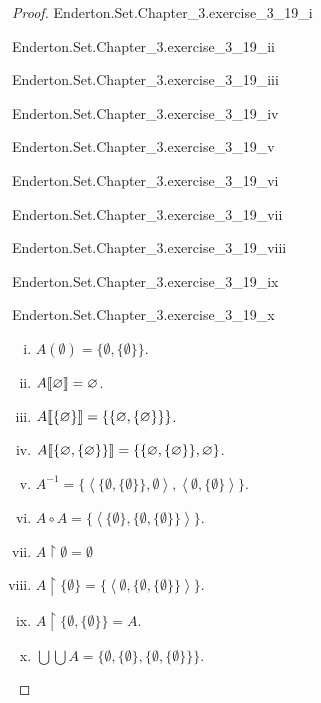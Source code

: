 \documentclass{report}
\newcommand{\pair}[1]{\left< #1 \right>}
\begin{document}
\begin{proof}

  \statementpadding

    {Enderton.Set.Chapter\_3.exercise\_3\_19\_i}

    {Enderton.Set.Chapter\_3.exercise\_3\_19\_ii}

    {Enderton.Set.Chapter\_3.exercise\_3\_19\_iii}

    {Enderton.Set.Chapter\_3.exercise\_3\_19\_iv}

    {Enderton.Set.Chapter\_3.exercise\_3\_19\_v}

    {Enderton.Set.Chapter\_3.exercise\_3\_19\_vi}

    {Enderton.Set.Chapter\_3.exercise\_3\_19\_vii}

    {Enderton.Set.Chapter\_3.exercise\_3\_19\_viii}

    {Enderton.Set.Chapter\_3.exercise\_3\_19\_ix}

    {Enderton.Set.Chapter\_3.exercise\_3\_19\_x}

  \begin{enumerate}[(i)]
    \item $A(\emptyset) = \{\emptyset, \{\emptyset\}\}$.
    \item $A\!\left\llbracket\varnothing\right\rrbracket = \varnothing$.
    \item $A\!\left\llbracket\{\varnothing\}\right\rrbracket = \{\{\varnothing, \{\varnothing\}\}\}$.
    \item $A\!\left\llbracket\{\varnothing, \{\varnothing\}\}\right\rrbracket =
      \{\{\varnothing, \{\varnothing\}\}, \varnothing\}$.
    \item $A^{-1} = \{
      \pair{\{\emptyset, \{\emptyset\}\}, \emptyset},
      \pair{\emptyset, \{\emptyset\}}
    \}$.
    \item $A \circ A =
      \{\pair{\{\emptyset\}, \{\emptyset, \{\emptyset\}\}}\}$.
    \item $A \restriction \emptyset = \emptyset$
    \item $A \restriction \{\emptyset\} =
      \{\pair{\emptyset, \{\emptyset, \{\emptyset\}\}}\}$.
    \item $A \restriction \{\emptyset, \{\emptyset\}\} = A$.
    \item $\bigcup\bigcup A =
      \{\emptyset, \{\emptyset\}, \{\emptyset, \{\emptyset\}\}\}$.
  \end{enumerate}

\end{proof}
\end{document}
